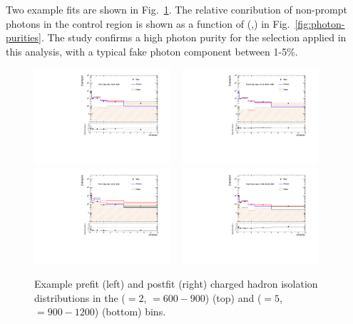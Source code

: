 Two example fits are shown in Fig.~\ref{fig:photonTemplateFits}. The
relative conribution of non-prompt photons in the \gj control region
is shown as a function of (\njet,\HT) in
Fig.~\ref{fig:photon-purities}.  The study confirms a high photon
purity for the selection applied in this analysis, with a typical fake
photon component between 1-5\%.

\begin{figure}[h!]
  \centering
  \includegraphics[width=0.45\textwidth]{figures/photonpurity/fakeFit_eq2j_600_prefit} ~
  \includegraphics[width=0.45\textwidth]{figures/photonpurity/fakeFit_eq2j_600_postfit} \\
  \includegraphics[width=0.45\textwidth]{figures/photonpurity/fakeFit_ge5j_900_prefit} ~
  \includegraphics[width=0.45\textwidth]{figures/photonpurity/fakeFit_ge5j_900_postfit}
  \caption{\label{fig:photonTemplateFits} 
  Example prefit (left) and postfit (right) charged hadron isolation
  distributions in the (\njet$=2$, \HT$=600-900$) (top) and 
  (\njet$=5$, \HT$=900-1200$) (bottom) bins.}
\end{figure}


